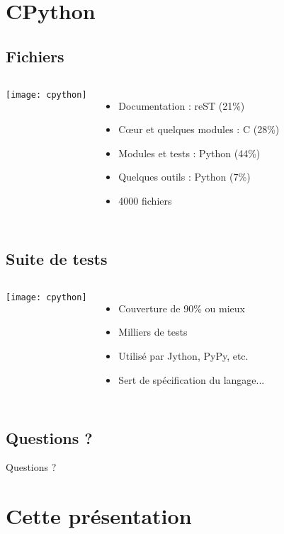 \documentclass[handout]{beamer}
\begin{document}
\section{CPython}

\subsection{Fichiers}
\frame
{
    \begin{columns}[c]
            \texttt{[image: cpython]}
            \begin{itemize}
            \item Documentation : reST (21\%)
            \item Cœur et quelques modules : C (28\%)
            \item Modules et tests : Python (44\%)
            \item Quelques outils : Python (7\%)
            \item 4000 fichiers
            \end{itemize}
    \end{columns}
}

\subsection{Suite de tests}
\frame
{
    \begin{columns}[c]
            \texttt{[image: cpython]}
            \begin{itemize}
            \item Couverture de 90\% ou mieux
            \item Milliers de tests
            \item Utilisé par Jython, PyPy, etc.
            \item Sert de spécification du langage...
            \end{itemize}
    \end{columns}
}

\subsection{Questions ?}
\frame
{
    \begin{center}
        Questions ?
    \end{center}
}

\section*{Cette présentation}
\end{document}
